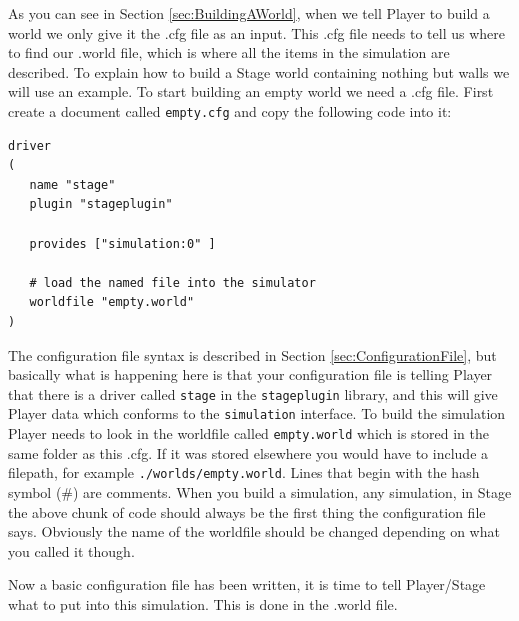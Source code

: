 \documentclass[a4paper]{report}
\newcommand{\plst}{Player/Stage\xspace}
\newcommand{\pl}{Player\xspace}
\begin{document}
As you can see in Section \ref{sec:BuildingAWorld}, when we tell \pl to build a world we only give it the .cfg file as an input. This .cfg file needs to tell us where to find our .world file, which is where all the items in the simulation are described. To explain how to build a Stage world containing nothing but walls we will use an example.\newline
To start building an empty world we need a .cfg file. First create a document called \verb|empty.cfg| and copy the following code into it:
\begin{verbatim}
driver
(		
   name "stage"
   plugin "stageplugin"

   provides ["simulation:0" ]

   # load the named file into the simulator
   worldfile "empty.world"	
)
\end{verbatim}
The configuration file syntax is described in Section \ref{sec:ConfigurationFile}, but basically what is happening here is that your configuration file is telling \pl that there is a driver called \verb|stage| in the \verb|stageplugin| library, and this will give \pl data which conforms to the \verb|simulation| interface. To build the simulation \pl needs to look in the worldfile called \verb|empty.world| which is stored in the same folder as this .cfg. If it was stored elsewhere you would have to include a filepath, for example \verb|./worlds/empty.world|. Lines that begin with the hash symbol (\#) are comments.
When you build a simulation, any simulation, in Stage the above chunk of code should always be the first thing the configuration file says. Obviously the name of the worldfile should be changed depending on what you called it though.

Now a basic configuration file has been written, it is time to tell \plst what to put into this simulation. This is done in the .world file. 
\end{document}
